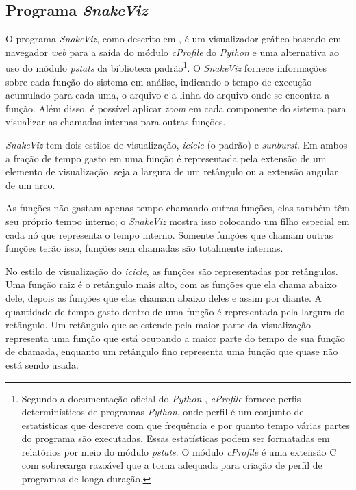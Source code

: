 \documentclass[12pt]{article}
\begin{document}

%

\subsection{Programa \textit{SnakeViz}}

O programa \textit{SnakeViz}, como descrito em \cite{SnakeViz:2022}, é um visualizador gráfico baseado em navegador \textit{web} para a saída do módulo \textit{cProfile} do \textit{Python} e uma alternativa ao uso do módulo \textit{pstats} da biblioteca padrão\footnote{Segundo a documentação oficial do \textit{Python} \cite{python:2022}, \textit{cProfile} fornece perfis determinísticos de programas \textit{Python}, onde perfil é um conjunto de estatísticas que descreve com que frequência e por quanto tempo várias partes do programa são executadas. Essas estatísticas podem ser formatadas em relatórios por meio do módulo \textit{pstats}. O módulo \textit{cProfile} é uma extensão C com sobrecarga razoável que a torna adequada para criação de perfil de programas de longa duração.}. O \textit{SnakeViz} fornece informações sobre cada função do sistema em análise, indicando o tempo de execução acumulado para cada uma, o arquivo e a linha do arquivo onde se encontra a função. Além disso, é possível aplicar \textit{zoom} em cada componente do sistema para visualizar as chamadas internas para outras funções.

\textit{SnakeViz} tem dois estilos de visualização, \textit{icicle} (o padrão) e \textit{sunburst}. Em ambos a fração de tempo gasto em uma função é representada pela extensão de um elemento de visualização, seja a largura de um retângulo ou a extensão angular de um arco.

As funções não gastam apenas tempo chamando outras funções, elas também têm seu próprio tempo interno; o \textit{SnakeViz} mostra isso colocando um filho especial em cada nó que representa o tempo interno. Somente funções que chamam outras funções terão isso, funções sem chamadas são totalmente internas.

No estilo de visualização do \textit{icicle}, as funções são representadas por retângulos. Uma função raiz é o retângulo mais alto, com as funções que ela chama abaixo dele, depois as funções que elas chamam abaixo deles e assim por diante. A quantidade de tempo gasto dentro de uma função é representada pela largura do retângulo. Um retângulo que se estende pela maior parte da visualização representa uma função que está ocupando a maior parte do tempo de sua função de chamada, enquanto um retângulo fino representa uma função que quase não está sendo usada.
\end{document}
